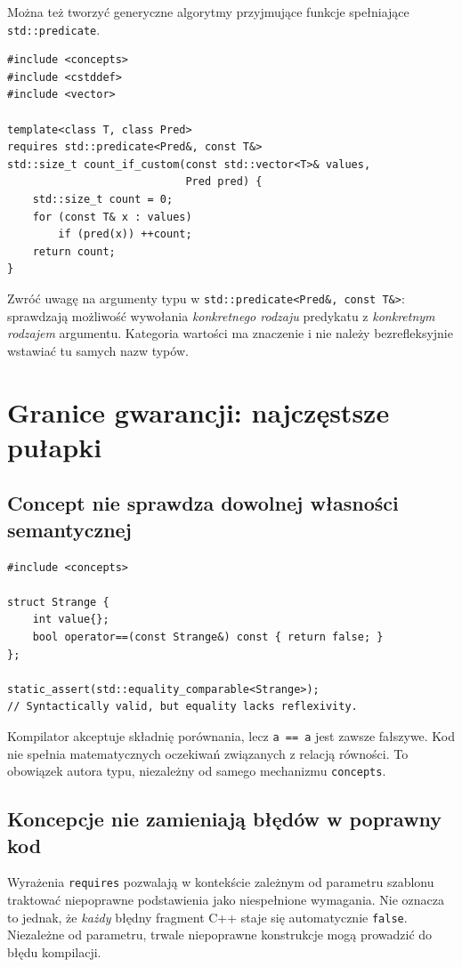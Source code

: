 Można też tworzyć generyczne algorytmy przyjmujące funkcje
spełniające \texttt{std::predicate}.

\begin{lstlisting}
#include <concepts>
#include <cstddef>
#include <vector>

template<class T, class Pred>
requires std::predicate<Pred&, const T&>
std::size_t count_if_custom(const std::vector<T>& values,
                            Pred pred) {
    std::size_t count = 0;
    for (const T& x : values)
        if (pred(x)) ++count;
    return count;
}
\end{lstlisting}

Zwróć uwagę na argumenty typu w
\texttt{std::predicate<Pred\&, const T\&>}:
sprawdzają możliwość wywołania \emph{konkretnego rodzaju}
predykatu z \emph{konkretnym rodzajem} argumentu.
Kategoria wartości ma znaczenie i nie należy bezrefleksyjnie
wstawiać tu samych nazw typów.

\section{Granice gwarancji: najczęstsze pułapki}
\label{sec:concepts-pulapki}

\subsection{Concept nie sprawdza dowolnej własności semantycznej}

\begin{lstlisting}
#include <concepts>

struct Strange {
    int value{};
    bool operator==(const Strange&) const { return false; }
};

static_assert(std::equality_comparable<Strange>);
// Syntactically valid, but equality lacks reflexivity.
\end{lstlisting}

Kompilator akceptuje składnię porównania, lecz
\texttt{a == a} jest zawsze fałszywe. Kod nie spełnia
matematycznych oczekiwań związanych z relacją równości.
To obowiązek autora typu, niezależny od samego mechanizmu
\texttt{concepts}.

\subsection{Koncepcje nie zamieniają błędów w poprawny kod}

Wyrażenia \texttt{requires} pozwalają w kontekście zależnym
od parametru szablonu traktować niepoprawne podstawienia
jako niespełnione wymagania. Nie oznacza to jednak, że
\emph{każdy} błędny fragment C++ staje się automatycznie
\texttt{false}. Niezależne od parametru, trwale niepoprawne
konstrukcje mogą prowadzić do błędu kompilacji.

